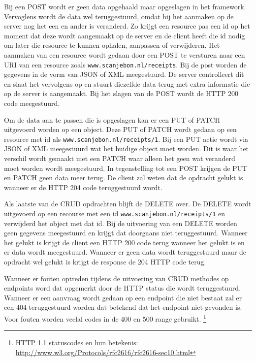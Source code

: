 \documentclass[a4paper,11pt,oneside]{report}
\begin{document}
Bij een POST wordt er geen data opgehaald maar opgeslagen in het framework.
Vervoglens wordt de data wel teruggestuurd, omdat bij het aanmaken op de server
nog het een en ander is veranderd. Zo krijgt een resource pas een id op het
moment dat deze wordt aangemaakt op de server en de client heeft die id nodig om
later die resource te kunnen ophalen, aanpassen of verwijderen. Het aanmaken van
een resource wordt gedaan door een POST te versturen naar een URI van een
resource zoals
\lstinline[style=code-block]|www.scanjebon.nl/receipts|.
Bij de post worden de gegevens in de vorm van JSON of XML meegestuurd. De server
controlleert dit en slaat het vervolgens op en stuurt diezelfde data terug met
extra informatie die op de server is aangemaakt. Bij het slagen van de POST
wordt de HTTP 200 code meegestuurd.

Om de data aan te passen die is opgeslagen kan er een PUT of PATCH uitgevoerd
worden op een object. Deze PUT of PATCH wordt gedaan op een resource met id als
\lstinline[style=code-block]|www.scanjebon.nl/receipts/1|.
Bij een PUT actie wordt via JSON of XML meegestuurd wat het huidige object moet
worden. Dit is waar het verschil wordt gemaakt met een PATCH waar alleen het
geen wat veranderd moet worden wordt meegestuurd. In tegenstelling tot een POST
krijgen de PUT en PATCH geen data meer terug. De client zal weten dat de
opdracht gelukt is wanneer er de HTTP 204 code teruggestuurd wordt.

Als laatste van de CRUD opdrachten blijft de DELETE over. De DELETE wordt
uitgevoerd op een recourse met een id
\lstinline[style=code-block]|www.scanjebon.nl/receipts/1|
en verwijderd het object met dat id. Bij de uitvoering van een DELETE worden
geen gegevens meegestuurd en krijgt dat doorgaans niet teruggestuurd. Wanneer
het gelukt is krijgt de client een HTTP 200 code terug wanneer het gelukt is en
er data wordt meegestuurd. Wanneer er geen data wordt teruggestuurd maar de
opdracht wel gelukt is krijgt de response de 204 HTTP code terug.

Wanneer er fouten optreden tijdens de uitvoering van CRUD methodes op endpoints
word dat opgemerkt door de HTTP status die wordt teruggestuurd. Wanneer er een
aanvraag wordt gedaan op een endpoint die niet bestaat zal er een 404
teruggestuurd worden dat betekend dat het endpoint niet gevonden is. Voor fouten
worden veelal codes in de 400 en 500 range gebruikt.
\footnote{HTTP 1.1 statuscodes en hun betekenis: \newline
\url{http://www.w3.org/Protocols/rfc2616/rfc2616-sec10.html}}
\end{document}
